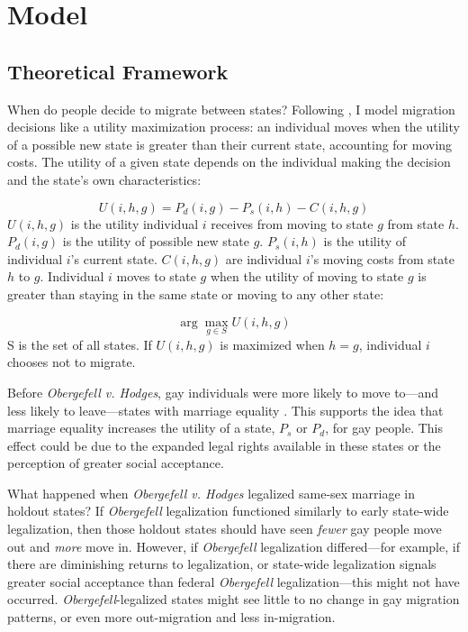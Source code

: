 \documentclass[12pt,letterpaper]{article}
\begin{document}
\section{Model}
\subsection{Theoretical Framework}
When do people decide to migrate between states? Following \citet{12}, I model migration decisions like a utility maximization process: an individual moves when the utility of a possible new state is greater than their current state, accounting for moving costs. The utility of a given state depends on the individual making the decision and the state’s own characteristics:

\begin{equation}
U(i, h, g) = P_d(i, g) - P_s(i, h) - C(i, h, g)
\end{equation}
$U(i, h, g)$ is the utility individual $i$ receives from moving to state $g$ from state $h$. $P_d(i, g)$ is the utility of possible new state $g$. $P_s(i, h)$ is the utility of individual $i$'s current state. $C(i, h, g)$ are individual $i$'s moving costs from state $h$ to $g$. Individual $i$ moves to state $g$ when the utility of moving to state $g$ is greater than staying in the same state or moving to any other state:

\begin{equation}
\arg\max_{g \in S} U(i, h, g)
\end{equation}
S is the set of all states. If $U(i, h, g)$ is maximized when $h = g$, individual $i$ chooses not to migrate.

\hfill
\break
Before \textit{Obergefell v. Hodges}, gay individuals were more likely to move to—and less likely to leave—states with marriage equality \citep{1, 12}. This supports the idea that marriage equality increases the utility of a state, $P_s$ or $P_d$, for gay people. This effect could be due to the expanded legal rights available in these states or the perception of greater social acceptance.

What happened when \textit{Obergefell v. Hodges} legalized same-sex marriage in holdout states? If \textit{Obergefell} legalization functioned similarly to early state-wide legalization, then those holdout states should have seen \textit{fewer} gay people move out and \textit{more} move in. However, if \textit{Obergefell} legalization differed—for example, if there are diminishing returns to legalization, or state-wide legalization signals greater social acceptance than federal \textit{Obergefell} legalization—this might not have occurred. \textit{Obergefell}-legalized states might see little to no change in gay migration patterns, or even more out-migration and less in-migration.
\end{document}
